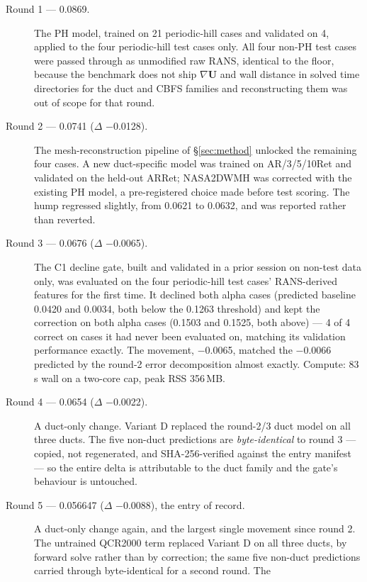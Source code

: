 \documentclass[11pt,a4paper]{article}
\newcommand{\breakus}{\textunderscore\allowbreak}
\newcommand{\code}[1]{{\small\ttfamily\let\_\breakus #1}}
\begin{document}
\begin{description}
\item[Round 1 --- 0.0869.] The PH model, trained on 21 periodic-hill cases and validated on
  4, applied to the four periodic-hill test cases only. All four non-PH test cases were
  passed through as unmodified raw RANS, identical to the floor, because the benchmark does
  not ship $\nabla\mathbf{U}$ and wall distance in solved time directories for the duct and
  CBFS families and reconstructing them was out of scope for that round.
\item[Round 2 --- 0.0741 ($\Delta$ $-$0.0128).] The mesh-reconstruction pipeline of
  \S\ref{sec:method} unlocked the remaining four cases. A new duct-specific model was
  trained on \code{AR\_1/3/5/10\_Ret\_180} and validated on the held-out
  \code{AR\_7\_Ret\_180}; \code{NASA\_2DWMH} was corrected with the existing PH model, a
  pre-registered choice made before test scoring. The hump regressed slightly, from 0.0621
  to 0.0632, and was reported rather than reverted.
\item[Round 3 --- 0.0676 ($\Delta$ $-$0.0065).] The C1 decline gate, built and validated in
  a prior session on non-test data only, was evaluated on the four periodic-hill test
  cases' RANS-derived features for the first time. It declined both \code{alpha\_05} cases
  (predicted baseline 0.0420 and 0.0034, both below the 0.1263 threshold) and kept the
  correction on both \code{alpha\_15} cases (0.1503 and 0.1525, both above) --- 4 of 4
  correct on cases it had never been evaluated on, matching its validation performance
  exactly. The movement, $-$0.0065, matched the $-$0.0066 predicted by the round-2 error
  decomposition almost exactly. Compute: 83\,s wall on a two-core cap, peak RSS 356\,MB.
\item[Round 4 --- 0.0654 ($\Delta$ $-$0.0022).] A duct-only change.
  Variant D replaced the round-2/3 duct model on all three ducts. The five non-duct
  predictions are \emph{byte-identical} to round 3 --- copied, not regenerated, and
  SHA-256-verified against the entry manifest --- so the entire delta is attributable to
  the duct family and the gate's behaviour is untouched.
\item[Round 5 --- 0.056647 ($\Delta$ $-$0.0088), the entry of record.] A duct-only change
  again, and the largest single movement since round 2. The untrained QCR2000 term
  replaced Variant D on all three ducts, by forward solve rather than by correction; the
  same five non-duct predictions carried through byte-identical for a second round. The

\end{description}
\end{document}
